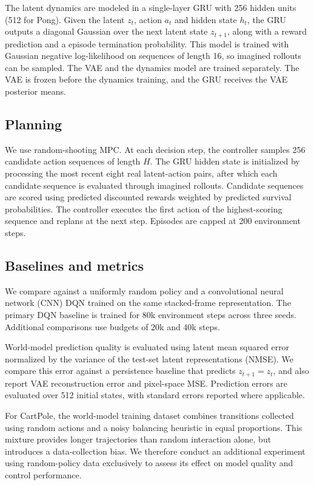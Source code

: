 \documentclass[conference]{IEEEtran}
\begin{document}
The latent dynamics  are modeled in a single-layer GRU \cite{cho2014} with 256 hidden units (512 for Pong). Given the latent $z_t$, action $a_t$ and hidden state $h_t$, the GRU outputs a diagonal Gaussian over the next latent state $z_{t+1}$, along with a reward prediction and a episode termination probability. This model is trained with Gaussian negative log-likelihood on sequences of length 16, so imagined rollouts can be sampled. The VAE and the dynamics model are trained separately. The VAE is frozen before the dynamics training, and the GRU receives the VAE posterior means.

\subsection{Planning}
We use random-shooting MPC. At each decision step, the controller samples 256 candidate action sequences of length $H$. The GRU hidden state is initialized by processing the most recent eight real latent-action pairs, after which each candidate sequence is evaluated through imagined rollouts. Candidate sequences are scored using predicted discounted rewards weighted by predicted survival probabilities. The controller executes the first action of the highest-scoring sequence and replans at the next step. Episodes are capped at 200 environment steps.

\subsection{Baselines and metrics}
We compare against a uniformly random policy and a convolutional neural network (CNN) DQN \cite{mnih2015} trained on the same stacked-frame representation. The primary DQN baseline is trained for 80k environment steps across three seeds. Additional comparisons use budgets of 20k and 40k steps.

World-model prediction quality is evaluated using latent mean squared error normalized by the variance of the test-set latent representations (NMSE). We compare this error against a persistence baseline that predicts $z_{t+1}=z_t$, and also report VAE reconstruction error and pixel-space MSE. Prediction errors are evaluated over 512 initial states, with standard errors reported where applicable.

For CartPole, the world-model training dataset combines transitions collected using random actions and a noisy balancing heuristic in equal proportions. This mixture provides longer trajectories than random interaction alone, but introduces a data-collection bias. We therefore conduct an additional experiment using random-policy data exclusively to assess its effect on model quality and control performance.
\end{document}

